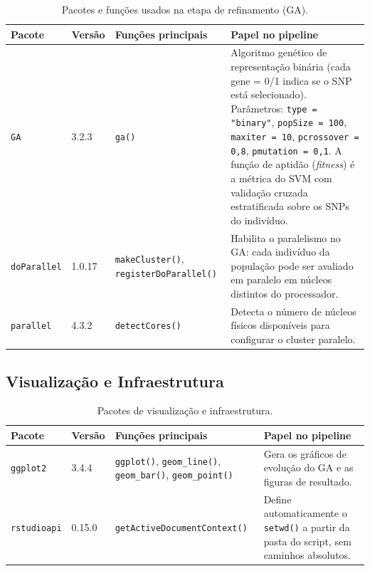 \documentclass[
    12pt,
    a4paper,
    oneside,
    english,
    french,
    spanish,
    brazil
    ]{abntex2}
\renewcommand{\arraystretch}{1.3}
\newcommand{\novo}[1]{\textcolor{corNova}{#1}}
\begin{document}
\begin{table}[H]
\centering
\caption{\novo{Pacotes e funções usados na etapa de refinamento (GA).}}
\label{tab:pkgs_ga}
\small
\renewcommand{\arraystretch}{1.35}
\begin{tabular}{L{2.4cm}|C{1.4cm}|L{4.2cm}|L{5.4cm}}
\hline
\textbf{Pacote} & \textbf{Versão} & \textbf{Funções principais} & \textbf{Papel no pipeline} \\
\hline
\texttt{GA} & 3.2.3 &
  \texttt{ga()} &
  Algoritmo genético de representação binária (cada gene = 0/1 indica se o SNP está selecionado). Parâmetros: \texttt{type = "binary"}, \texttt{popSize = 100}, \texttt{maxiter = 10}, \texttt{pcrossover = 0{,}8}, \texttt{pmutation = 0{,}1}. A função de aptidão (\textit{fitness}) é a métrica do SVM com validação cruzada estratificada sobre os SNPs do indivíduo. \\
\hline
\texttt{doParallel} & 1.0.17 &
  \texttt{makeCluster()}, \texttt{registerDoParallel()} &
  Habilita o paralelismo no GA: cada indivíduo da população pode ser avaliado em paralelo em núcleos distintos do processador. \\
\hline
\texttt{parallel} & 4.3.2 &
  \texttt{detectCores()} &
  Detecta o número de núcleos físicos disponíveis para configurar o cluster paralelo. \\
\hline
\end{tabular}
\end{table}

\subsection*{Visualização e Infraestrutura}

\begin{table}[H]
\centering
\caption{\novo{Pacotes de visualização e infraestrutura.}}
\label{tab:pkgs_infra}
\small
\renewcommand{\arraystretch}{1.35}
\begin{tabular}{L{2.4cm}|C{1.4cm}|L{5.6cm}|L{4.0cm}}
\hline
\textbf{Pacote} & \textbf{Versão} & \textbf{Funções principais} & \textbf{Papel no pipeline} \\
\hline
\texttt{ggplot2} & 3.4.4 &
  \texttt{ggplot()}, \texttt{geom\_line()}, \texttt{geom\_bar()}, \texttt{geom\_point()} &
  Gera os gráficos de evolução do GA e as figuras de resultado. \\
\hline
\texttt{rstudioapi} & 0.15.0 &
  \texttt{getActiveDocumentContext()} &
  Define automaticamente o \texttt{setwd()} a partir da pasta do script, sem caminhos absolutos. \\
\hline
\end{tabular}
\end{table}
\end{document}
